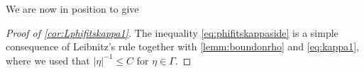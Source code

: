 \documentclass[
	fontsize=11pt, 
	twoside=false, 
	abstract=true, 
	a4paper,
]{scrartcl}
\newcommand{\abs}[1]{\left\lvert#1\right\rvert}
\newcommand{\del}{\partial}
\begin{document}
We are now in position to give
\begin{proof}[Proof of \cref{cor:Lphifitskappa1}]
	The inequality \cref{eq:phifitskappaside} is a simple consequence of Leibnitz's rule together with \cref{lemm:boundonrho} and \cref{eq:kappa1}, where we used that $\abs{\eta}^{-1} \leq C$ for $\eta \in \Gamma$.
%
%
%
%
%
%
%
\end{proof}
\end{document}
